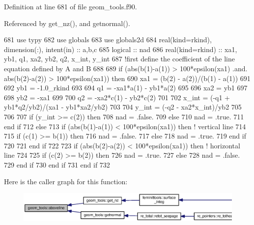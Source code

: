 Definition at line 681 of file geom\+\_\+tools.\+f90.



Referenced by get\+\_\+nz(), and getnormal().


\begin{DoxyCode}
681     \textcolor{keywordtype}{use }typy
682     \textcolor{keywordtype}{use }globals
683     \textcolor{keywordtype}{use }globals2d
684     \textcolor{keywordtype}{real(kind=rkind)}, \textcolor{keywordtype}{dimension(:)}, \textcolor{keywordtype}{intent(in)} :: a,b,c
685     \textcolor{keywordtype}{logical} :: nad
686     \textcolor{keywordtype}{real(kind=rkind)} :: xa1, yb1, q1, xa2, yb2, q2, x\_int, y\_int
687     \textcolor{comment}{!first define the coefficient of the line equation defined by A and B}
688     
689     \textcolor{keywordflow}{if} (abs(b(1)-a(1)) > 100*epsilon(xa1) .and. abs(b(2)-a(2)) > 100*epsilon(xa1)) \textcolor{keywordflow}{then}
690       xa1 = (b(2) - a(2))/(b(1) - a(1))
691       
692       yb1 = -1.0\_rkind
693       
694       q1 = -xa1*a(1) - yb1*a(2)
695 
696       xa2 = yb1
697       
698       yb2 = -xa1
699       
700       q2 = -xa2*c(1) - yb2*c(2) 
701       
702       x\_int = (-q1 + yb1*q2/yb2)/(xa1 - yb1*xa2/yb2)
703       
704       y\_int = (-q2 - xa2*x\_int)/yb2
705       
706       
707       \textcolor{keywordflow}{if} (y\_int >= c(2)) \textcolor{keywordflow}{then}
708         nad = .false.
709       \textcolor{keywordflow}{else}
710         nad = .true.
711 \textcolor{keywordflow}{      end if}
712     \textcolor{keywordflow}{else}
713       \textcolor{keywordflow}{if} (abs(b(1)-a(1)) < 100*epsilon(xa1)) \textcolor{keywordflow}{then} \textcolor{comment}{! vertical line}
714  
715         \textcolor{keywordflow}{if} (c(1) >= b(1)) \textcolor{keywordflow}{then} 
716           nad = .false.
717         \textcolor{keywordflow}{else} 
718           nad = .true.
719 \textcolor{keywordflow}{        end if}
720         
721 \textcolor{keywordflow}{      end if}
722       
723       \textcolor{keywordflow}{if} (abs(b(2)-a(2)) < 100*epsilon(xa1)) \textcolor{keywordflow}{then} \textcolor{comment}{! horizontal line}
724         
725         \textcolor{keywordflow}{if} (c(2) >= b(2)) \textcolor{keywordflow}{then}
726           nad = .true.
727         \textcolor{keywordflow}{else}
728           nad = .false.
729 \textcolor{keywordflow}{        end if}
730 \textcolor{keywordflow}{      end if}
731 \textcolor{keywordflow}{    end if}
732       
\end{DoxyCode}


Here is the caller graph for this function\+:\nopagebreak
\begin{figure}[H]
\begin{center}
\leavevmode
\includegraphics[width=350pt]{namespacegeom__tools_addda2c9ac04812dd1ae188c3780594f4_icgraph}
\end{center}
\end{figure}


